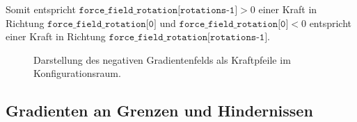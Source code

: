 Somit entspricht $\texttt{force\_field\_rotation[rotations-1]} > 0 $ einer Kraft in Richtung $\texttt{force\_field\_rotation[0]}$ und $ \texttt{force\_field\_rotation[0]} < 0 $ entspricht einer Kraft in Richtung $\texttt{force\_field\_rotation[rotations-1]}$.
\begin{figure}[H]
	\centering
	\footnotesize
	\centerline{}
	\vspace*{-0.23cm}
	\caption{Darstellung des negativen Gradientenfelds als Kraftpfeile im Konfigurationsraum.}
\end{figure}

\subsection{Gradienten an Grenzen und Hindernissen}

